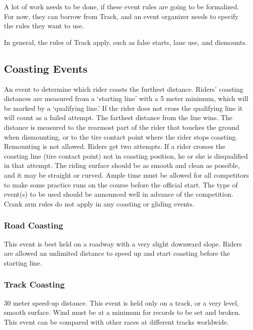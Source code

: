 \begin{comment2016}
  A lot of work needs to be done, if these event rules are going to be formalized.
  For now, they can borrow from Track, and an event organizer needs to specify the rules they want to use.
\end{comment2016}

In general, the rules of Track apply, such as false starts, lane use, and dismounts.

\subsection{Coasting Events}
An event to determine which rider coasts the furthest distance.
Riders' coasting distances are measured from a `starting line' with a 5 meter minimum, which will be marked by a `qualifying line.'
If the rider does not cross the qualifying line it will count as a failed attempt.
The farthest distance from the line wins.
The distance is measured to the rearmost part of the rider that touches the ground when dismounting, or to the tire contact point where the rider stops coasting.
Remounting is not allowed.
Riders get two attempts.
If a rider crosses the coasting line (tire contact point) not in coasting position, he or she is disqualified in that attempt.
The riding surface should be as smooth and clean as possible, and it may be straight or curved.
Ample time must be allowed for all competitors to make some practice runs on the course before the official start.
The type of event(s) to be used should be announced well in advance of the competition.
Crank arm rules do not apply in any coasting or gliding events.

\subsubsection{Road Coasting}

This event is best held on a roadway with a very slight downward slope.
Riders are allowed an unlimited distance to speed up and start coasting before the starting line.

\subsubsection{Track Coasting \label{subsubsec:track-field_alternate-optional-fun-events_coasting_track-coasting}}
30 meter speed-up distance.
This event is held only on a track, or a very level, smooth surface.
Wind must be at a minimum for records to be set and broken.
This event can be compared with other races at different tracks worldwide.

